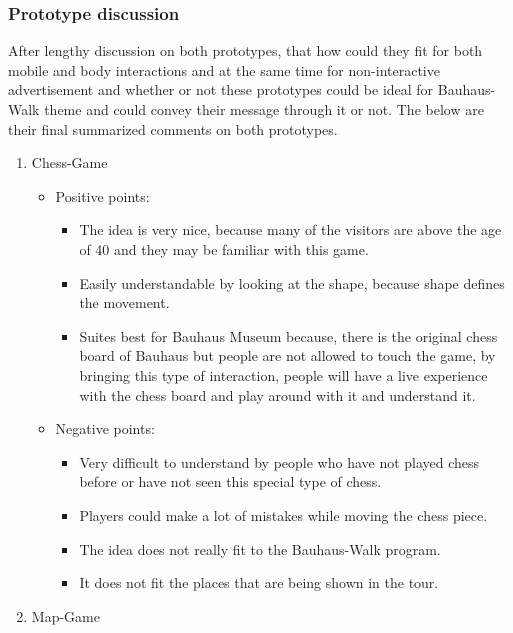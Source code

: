 \subsubsection{Prototype discussion}
After lengthy discussion on both prototypes, that how could they fit for both mobile and body interactions and at the same time for non-interactive advertisement and whether or not these prototypes could be ideal for Bauhaus-Walk theme and could convey their message through it or not. The below are their final summarized comments on both prototypes. 

\begin {enumerate}

\item Chess-Game

\begin {itemize}

\item{Positive points:} 

\begin {itemize}
\item	The idea is very nice, because many of the visitors are above the age of 40 and they may be familiar with this game.
\item	Easily understandable by looking at the shape, because shape defines the movement. 
\item	Suites best for Bauhaus Museum because, there is the original chess board of Bauhaus but people are not allowed to touch the game, by bringing this type of interaction, people will have a live experience with the chess board and play around with it and understand it.

\end {itemize}

\item{Negative points:} \
\begin {itemize}
\item	Very difficult to understand by people who have not played chess before or have not seen this special type of chess.
\item	Players could make a lot of mistakes while moving the chess piece. 
\item	The idea does not really fit to the Bauhaus-Walk program.
\item	It does not fit the places that are being shown in the tour.
\end {itemize}
\end {itemize}

\item Map-Game 


\end{enumerate}

